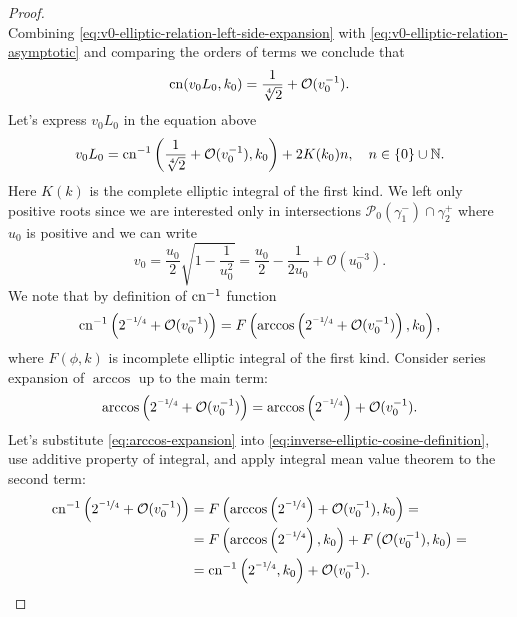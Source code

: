 \begin{proof}
\begin{equation}
	\label{eq:v0-elliptic-relation-left-side-expansion}
	\end{equation}
	Combining \eqref{eq:v0-elliptic-relation-left-side-expansion} with \eqref{eq:v0-elliptic-relation-asymptotic} and comparing the orders of terms we conclude that
	\begin{equation}
		\mathrm{cn} (v_0 L_0, k_0) = \frac{1}{\sqrt[4]{2}} + \mathcal{O}(v_0^{-1}).
	\end{equation}
	Let's express $v_0 L_0$ in the equation above 
	\begin{equation}
		v_0 L_0 = \mathrm{cn}^{-1} \left( \frac{1}{\sqrt[4]{2}} + \mathcal{O}(v_0^{-1}), k_0 \right) + 2 K(k_0) n, \quad n \in \{0\} \cup \mathbb{N}.
	\label{eq:v0-L0-expression}
	\end{equation}
	Here $K(k)$ is the complete elliptic integral of the first kind. 
	We left only positive roots since we are interested only in intersections $\mathcal{P}_0(\gamma_1^-) \cap \gamma_2^+$ where $u_0$ is positive and we can write
	\begin{equation}
		v_0 = \frac{u_0}{2} \sqrt{1 - \frac{1}{u_0^2}} = \frac{u_0}{2} - \frac{1}{2u_0} + \mathcal{O}(u_0^{-3}).
	\label{eq:v0-through-u0}
	\end{equation}
	We note that by definition of $\mathrm{cn}^{-1}$ function
	\begin{equation}
		\mathrm{cn}^{-1} \left( 2^{\nicefrac{-1}{4}} + \mathcal{O}(v_0^{-1}) \right) = F \left( \arccos \left( 2^{\nicefrac{-1}{4}} + \mathcal{O}(v_0^{-1}) \right), k_0 \right),
	\label{eq:inverse-elliptic-cosine-definition}
	\end{equation}
	where $F(\phi, k)$ is incomplete elliptic integral of the first kind.
	Consider series expansion of $\arccos$ up to the main term:
	\begin{equation}
		\arccos \left( 2^{\nicefrac{-1}{4}} + \mathcal{O}(v_0^{-1}) \right) = \arccos \left( 2^{\nicefrac{-1}{4}} \right) + \mathcal{O}(v_0^{-1}).
	\label{eq:arccos-expansion}
	\end{equation}
	Let's substitute \eqref{eq:arccos-expansion} into \eqref{eq:inverse-elliptic-cosine-definition}, use additive property of integral, and apply integral mean value theorem to the second term:
	\begin{equation}
	\begin{split}
		\cn^{-1} \left( 2^{\nicefrac{-1}{4}} + \mathcal{O}(v_0^{-1}) \right) & = F \left( \arccos \left( 2^{\nicefrac{-1}{4}} \right) + \mathcal{O}(v_0^{-1}), k_0 \right) = \\ & = F \left( \arccos \left( 2^{\nicefrac{-1}{4}} \right), k_0 \right) + F \left( \mathcal{O}(v_0^{-1}), k_0 \right) = \\ & = \cn^{-1} \left( 2^{\nicefrac{-1}{4}}, k_0 \right) + \mathcal{O}(v_0^{-1}).

\end{split}
\end{equation}
\end{proof}
